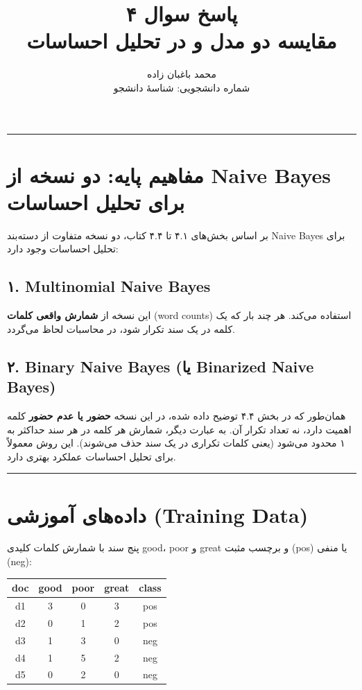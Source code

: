 \documentclass[11pt,a4paper]{article}
\title{\textbf{پاسخ سوال ۴} \\[0.4cm] \footnotesize مقایسه دو مدل \en{Multinomial Naive Bayes} و \en{Binary Naive Bayes} در تحلیل احساسات}
\author{محمد باغبان زاده \\ شماره دانشجویی: شناسهٔ دانشجو}
\date{}
\newcommand{\en}[1]{\textenglish{#1}}
\newcommand{\separator}{\vspace{1em}\noindent\rule{\linewidth}{0.4pt}\vspace{1em}}
\newcommand{\thickseparator}{\vspace{1em}\noindent\rule{\linewidth}{1pt}\vspace{1em}}
\begin{document}
\maketitle
\thickseparator

\section{مفاهیم پایه: دو نسخه از \en{Naive Bayes} برای تحلیل احساسات}
بر اساس بخش‌های ۴.۱ تا ۴.۴ کتاب، دو نسخه متفاوت از دسته‌بند \en{Naive Bayes} برای تحلیل احساسات وجود دارد:

\subsection*{۱. \en{Multinomial Naive Bayes}}
این نسخه از \textbf{شمارش واقعی کلمات} (\en{word counts}) استفاده می‌کند. هر چند بار که یک کلمه در یک سند تکرار شود، در محاسبات لحاظ می‌گردد.

\subsection*{۲. \en{Binary Naive Bayes} (یا \en{Binarized Naive Bayes})}
همان‌طور که در بخش ۴.۴ توضیح داده شده، در این نسخه \textbf{حضور یا عدم حضور} کلمه اهمیت دارد، نه تعداد تکرار آن. به عبارت دیگر، شمارش هر کلمه در هر سند حداکثر به ۱ محدود می‌شود (یعنی کلمات تکراری در یک سند حذف می‌شوند). این روش معمولاً برای تحلیل احساسات عملکرد بهتری دارد.

\separator
\section{داده‌های آموزشی (\en{Training Data})}
پنج سند با شمارش کلمات کلیدی \en{good}، \en{poor} و \en{great} و برچسب مثبت (\en{pos}) یا منفی (\en{neg}):

\begin{center}
\begin{tabular}{|c|c|c|c|c|}
\hline
\textbf{\en{doc}} & \textbf{\en{good}} & \textbf{\en{poor}} & \textbf{\en{great}} & \textbf{\en{class}} \\
\hline
\en{d1} & 3 & 0 & 3 & \en{pos} \\
\hline
\en{d2} & 0 & 1 & 2 & \en{pos} \\
\hline
\en{d3} & 1 & 3 & 0 & \en{neg} \\
\hline
\en{d4} & 1 & 5 & 2 & \en{neg} \\
\hline
\en{d5} & 0 & 2 & 0 & \en{neg} \\
\hline
\end{tabular}
\end{center}
\end{document}
